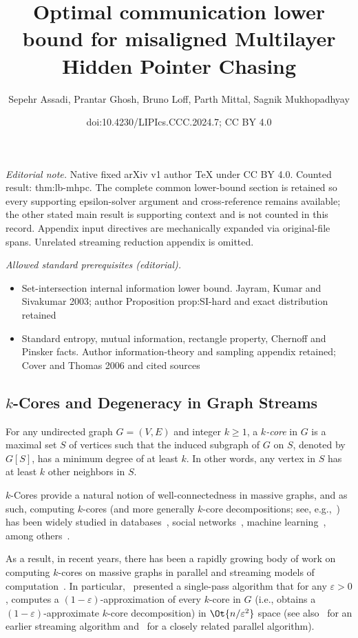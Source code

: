 \documentclass[11pt,letterpaper]{article}
\title{Optimal communication lower bound for misaligned Multilayer Hidden Pointer Chasing}
\author{Sepehr Assadi, Prantar Ghosh, Bruno Loff, Parth Mittal, Sagnik Mukhopadhyay}
\date{doi:10.4230/LIPIcs.CCC.2024.7; CC BY 4.0}
\newcommand{\eps}{\varepsilon}
\renewcommand{\geq}{\geqslant}
\theoremstyle{definition}
\begin{document}
\maketitle
\setcounter{section}{2}
\noindent\textit{Editorial note.} Native fixed arXiv v1 author TeX under CC BY 4.0. Counted result: thm:lb-mhpc. The complete common lower-bound section is retained so every supporting epsilon-solver argument and cross-reference remains available; the other stated main result is supporting context and is not counted in this record. Appendix input directives are mechanically expanded via original-file spans. Unrelated streaming reduction appendix is omitted.\par\medskip
\noindent\textit{Allowed standard prerequisites (editorial).}\begin{itemize}
\item Set-intersection internal information lower bound. Jayram, Kumar and Sivakumar 2003; author Proposition prop:SI-hard and exact distribution retained
\item Standard entropy, mutual information, rectangle property, Chernoff and Pinsker facts. Author information-theory and sampling appendix retained; Cover and Thomas 2006 and cited sources
\end{itemize}\medskip
\subsection{\texorpdfstring{$k$-Cores}{k-Cores} and Degeneracy in Graph Streams}\label{sec:degen-intro}

For any undirected graph $G=(V,E)$ and integer $k \geq 1$, a \emph{$k$-core} in $G$ is a maximal set $S$ of vertices such that the induced subgraph of $G$ on $S$, denoted by $G[S]$, has a minimum degree of at least $k$. In other words, 
any vertex in $S$ has at least $k$ other neighbors in $S$. 

$k$-Cores provide a natural notion of well-connectedness in massive graphs, and as such, computing $k$-cores (and more generally $k$-core decompositions; see, e.g.,~\cite{LiuSYDS22}) 
has been widely studied in databases~\cite{BonchiGKV14, ChuZ00ZXZ20, LiZZQZL19}, social networks~\cite{DhulipalaBS17, DhulipalaBS18, KhaouidBST15}, machine learning~\cite{Alvarez-HamelinDBV05, EsfandiariLM18, GhaffariLM19}, 
among others~\cite{LiWSX18,GalimbertiBGL20, SariyuceGJWC13}. 

As a result, in recent years, there has been a rapidly growing body of work on
computing $k$-cores on massive graphs in parallel and streaming
models of computation~\cite{SariyuceGJWC13,DhulipalaBS17, DhulipalaBS18,EsfandiariLM18, GhaffariLM19,LiuSYDS22}. In particular,~\cite{EsfandiariLM18} presented a single-pass algorithm that for any $\eps > 0$, 
computes a $(1-\eps)$-approximation of every $k$-core in $G$ (i.e., obtains a $(1-\eps)$-approximate $k$-core decomposition) in $\Ot{n/\eps^2}$ space (see also~\cite{SariyuceGJWC13} for an earlier streaming algorithm and~\cite{GhaffariLM19}
for a closely related parallel algorithm). 
\end{document}
